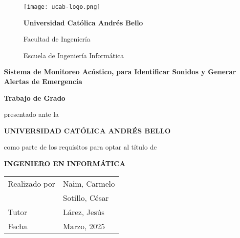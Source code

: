 \newcommand{\touppercase}[1]{\MakeUppercase{#1}}

\newcommand{\universidad}{Universidad Católica Andrés Bello}
\newcommand{\titulo}{Sistema de Monitoreo Acústico, para Identificar Sonidos y Generar Alertas de Emergencia \\}
\newcommand{\tutor}{Lárez, Jesús}

\newcommand{\membrete}{
  \normalsize\selectfont\bfseries
  \universidad \par
  Facultad de Ingeniería \par
  Escuela de Ingeniería Informática \par
}

\newcommand{\prelude}{
  \textbf{Trabajo de Grado} \par
  presentado ante la \par
  \touppercase{\textbf{\universidad}} \par
  como parte de los requisitos para optar al título de \par
  \touppercase{\textbf{Ingeniero en Informática}} \par
}

\newcommand{\details}{
  \begin{table}[h!]
    \begin{tabular}{p{0.4\textwidth} l}
      Realizado por & Naim, Carmelo  \\
                    & Sotillo, César \\
      Tutor         & \tutor         \\
      Fecha         & Marzo, 2025    \\
    \end{tabular}
  \end{table}
}

\begin{center}
  \begin{figure}[h]
    \centering
    \texttt{[image: ucab-logo.png]} \\
    \centering
    \renewcommand{\baselinestretch}{1.5}
    \membrete
  \end{figure}
  \vspace*{\fill}
  \textbf{\titulo}
  \vspace*{\fill}
  \prelude
  \vspace*{\fill}
  \details
\end{center}

\clearpage
